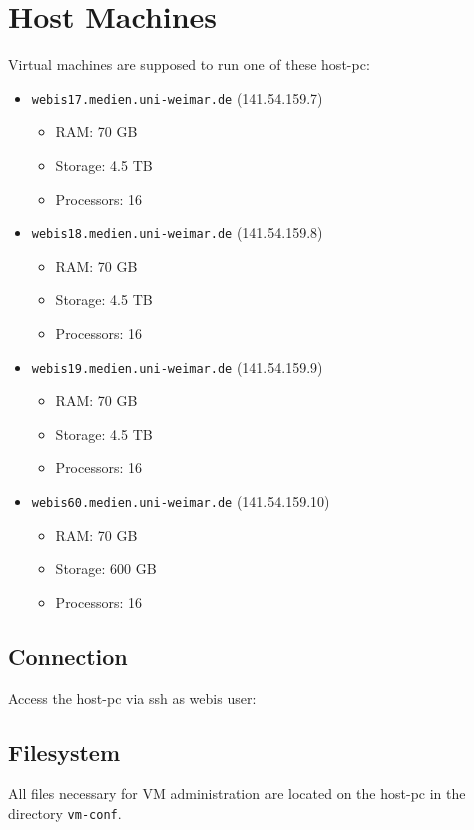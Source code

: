 \chapter{Host Machines}

Virtual machines are supposed to run one of these host-pc:
\begin{itemize}
\item \texttt{webis17.medien.uni-weimar.de} (141.54.159.7)
\begin{itemize}
\item RAM: 70 GB
\item Storage: 4.5 TB 
\item Processors: 16
\end{itemize}
\item \texttt{webis18.medien.uni-weimar.de} (141.54.159.8)
\begin{itemize}
\item RAM: 70 GB
\item Storage: 4.5 TB 
\item Processors: 16
\end{itemize}
\item \texttt{webis19.medien.uni-weimar.de} (141.54.159.9)
\begin{itemize}
\item RAM: 70 GB
\item Storage: 4.5 TB 
\item Processors: 16
\end{itemize}
\item \texttt{webis60.medien.uni-weimar.de} (141.54.159.10)
\begin{itemize}
\item RAM: 70 GB
\item Storage: 600 GB 
\item Processors: 16
\end{itemize}
\end{itemize}


\section{Connection}
Access the host-pc via ssh as webis user:\\

\section{Filesystem}\label{filesystem}
All files necessary for VM administration are located on the host-pc in the directory \texttt{vm-conf}.\\

